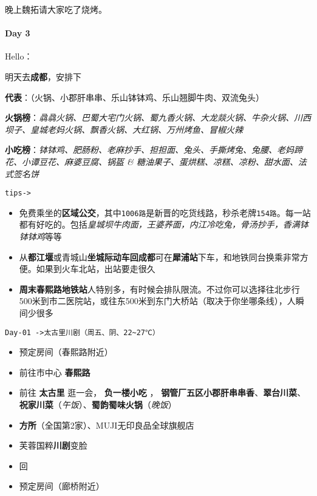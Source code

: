 \documentclass[UTF8,a4paper,8pt]{ctexart}
\begin{document}
	 	 晚上魏拓请大家吃了烧烤。
 	 \paragraph{Day 3       \quad     }
	 	 Hello：
	 	 
	 	 明天去\textbf{成都}，安排下
	 	 
	 	 \newpage
	 	 \textbf{代表}：（火锅、小郡肝串串、乐山钵钵鸡、乐山翘脚牛肉、双流兔头）
		 	 
		 \textbf{火锅榜}：\textit{骉骉火锅、巴蜀大宅门火锅、蜀九香火锅、大龙燚火锅、牛杂火锅、川西坝子、皇城老妈火锅、飘香火锅、大红锅、万州烤鱼、冒椒火辣}
		 
		 \textbf{小吃榜}：\textit{钵钵鸡、肥肠粉、老麻抄手、担担面、兔头、手撕烤兔、兔腰、老妈蹄花、小谭豆花、麻婆豆腐、锅盔 \& 糖油果子、蛋烘糕、凉糕、凉粉、甜水面、法式签名饼}
		 
		 \verb|tips-> |
			 \begin{itemize}[itemindent = 2em]
			 	\item  免费乘坐的\textbf{区域公交}，其中\verb|1006路|是新晋的吃货线路，秒杀老牌\verb|154路|。每一站都有好吃的。包括\textit{皇城坝牛肉面，王婆荞面，内江冷吃兔，骨汤抄手，香满钵钵钵鸡}等等
			 	\item  从\textbf{都江堰}或青城山\textbf{坐城际动车回成都}可在\textbf{犀浦站}下车，和地铁同台换乘非常方便。如果到火车北站，出站要走很久 
			 	\item  \textbf{周末春熙路地铁站}人特别多，有时候会排队限流。不过你可以选择往北步行500米到市二医院站，或往东500米到东门大桥站（取决于你坐哪条线），人瞬间少很多 
			 \end{itemize}
		 
		 	 \verb|Day-01 ->太古里川剧（周五、阴、22~27℃）|
		 	 
		 	 \begin{itemize}[itemindent = 2em]
		 	 	\item 预定房间（春熙路附近）
		 	 	\item 前往市中心 \textbf{春熙路}
		 	 	\item 前往 \textbf{太古里} 逛一会， \textbf{负一楼小吃} ， \textbf{钢管厂五区小郡肝串串香}、\textbf{翠台川菜}、\textbf{祝家川菜}（\textit{午饭}）、\textbf{蜀韵蜀味火锅}（\textit{晚饭}）
		 	 	\item \textbf{方所}（全国第2家）、MUJI无印良品全球旗舰店
		 	 	\item 芙蓉国粹\textbf{川剧}变脸 	
		 	 	\item 回 	
		 	 	\item 预定房间（廊桥附近）
		 	 \end{itemize}
		 	 
\end{document}
